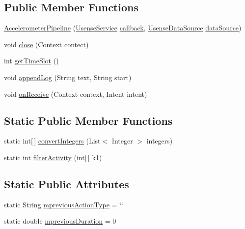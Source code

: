 \subsection*{Public Member Functions}
\begin{DoxyCompactItemize}
\item 
\hyperlink{classcs_1_1usense_1_1accelerometer_1_1_accelerometer_pipeline_a9bbc2abacfc59228d90ae9156acb905b}{Accelerometer\+Pipeline} (\hyperlink{classcs_1_1usense_1_1_usense_service}{Usense\+Service} \hyperlink{classcs_1_1usense_1_1accelerometer_1_1_accelerometer_pipeline_a2066e6ad6ad9c458c1a92ba3212618c9}{callback}, \hyperlink{classcs_1_1usense_1_1db_1_1_usense_data_source}{Usense\+Data\+Source} \hyperlink{classcs_1_1usense_1_1accelerometer_1_1_accelerometer_pipeline_a7eb5f78b5db36060e6b97578b6677162}{data\+Source})
\item 
void \hyperlink{classcs_1_1usense_1_1accelerometer_1_1_accelerometer_pipeline_abdebee197218ef4a7b7958dac92085f9}{close} (Context contect)
\item 
int \hyperlink{classcs_1_1usense_1_1accelerometer_1_1_accelerometer_pipeline_ad0603276881e7a9b8b658016715ac15d}{get\+Time\+Slot} ()
\item 
void \hyperlink{classcs_1_1usense_1_1accelerometer_1_1_accelerometer_pipeline_abd8f9d677e6f279bf28b3878f8a9d81b}{append\+Log} (String text, String start)
\item 
void \hyperlink{classcs_1_1usense_1_1accelerometer_1_1_accelerometer_pipeline_ad5bef064b0cbdb5a2ae6d451ac7c9964}{on\+Receive} (Context context, Intent intent)
\end{DoxyCompactItemize}
\subsection*{Static Public Member Functions}
\begin{DoxyCompactItemize}
\item 
static int\mbox{[}$\,$\mbox{]} \hyperlink{classcs_1_1usense_1_1accelerometer_1_1_accelerometer_pipeline_ab62cd6d034dc44bdfebf698b5aaf67a3}{convert\+Integers} (List$<$ Integer $>$ integers)
\item 
static int \hyperlink{classcs_1_1usense_1_1accelerometer_1_1_accelerometer_pipeline_a2da1dfafb131b394de16cccbff2d7d25}{filter\+Activity} (int\mbox{[}$\,$\mbox{]} k1)
\end{DoxyCompactItemize}
\subsection*{Static Public Attributes}
\begin{DoxyCompactItemize}
\item 
static String \hyperlink{classcs_1_1usense_1_1accelerometer_1_1_accelerometer_pipeline_a8dfa8f0337687436d1c9b67627160583}{mprevious\+Action\+Type} = \char`\"{}\char`\"{}
\item 
static double \hyperlink{classcs_1_1usense_1_1accelerometer_1_1_accelerometer_pipeline_ac81e903529c99657f1e278f2a7af5203}{mprevious\+Duration} = 0
\end{DoxyCompactItemize}
